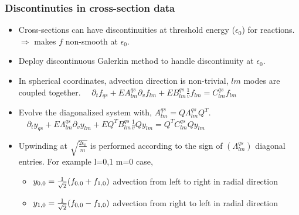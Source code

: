 \documentclass[mathserif, aspectratio=169]{beamer}
\newcommand{\of}[1]{\mleft( #1 \mright)}
\begin{document}
\begin{frame}[fragile]
	\frametitle{Discontinuties in cross-section data}
	\begin{itemize}
		\item Cross-sections can have discontinuities at threshold energy ($\epsilon_{0}$) for reactions.   $\Rightarrow$ makes $f$ non-smooth at $\epsilon_{0}$.
		\item Deploy discontinuous Galerkin method to handle discontinuity at $\epsilon_{0}$.
	\end{itemize}
	\begin{figure}
		\centering
	\end{figure}
	\begin{itemize}
		\item In spherical coordinates, advection direction is non-trivial, $lm$ modes are coupled together. 
		$\displaystyle
		\quad
		\partial_tf_{qs} + E A^{qs}_{lm} \partial_v f_{lm} +E B^{qs}_{lm} \frac{1}{v}f_{lm}  = C^{qs}_{lm}f_{lm}
		$
		\item Evolve the diagonalized system with, $A^{qs}_{lm} = Q \Lambda^{qs}_{lm} Q^T$.
		$\displaystyle
		\quad
		\partial_t y_{qs} +E\Lambda^{qs}_{lm} \partial_v y_{lm} +E Q^T B^{qs}_{lm} \frac{1}{v} Q y_{lm} = Q^T C^{qs}_{lm} Q y_{lm}
		$
		\item Upwinding at $\sqrt{\frac{2\epsilon_0}{m}}$ is performed according to the  sign of $(\Lambda^{qs}_{lm})$ diagonal entries. For example l=0,1 m=0 case,  
		\begin{itemize}
			\item $y_{0,0}= \frac{1}{\sqrt{2}}\of{f_{0,0} + f_{1,0}}$ advection from left to right in radial direction
			\item $y_{1,0}= \frac{1}{\sqrt{2}}\of{f_{0,0} - f_{1,0}}$ advection from right to left in radial direction
		\end{itemize}
	\end{itemize}
	
\end{frame}
\end{document}
